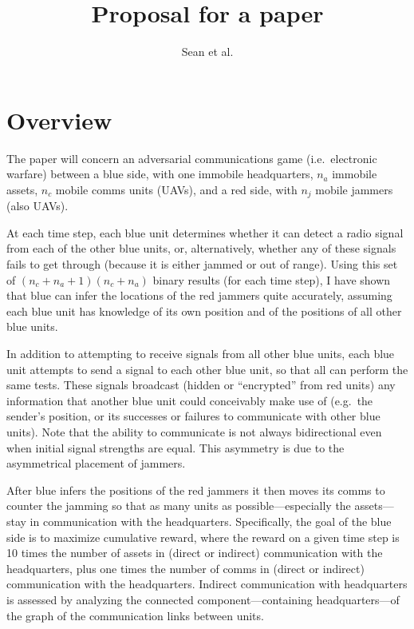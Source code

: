 \documentclass{article}
\title{Proposal for a paper}
\author{Sean et al.}
\begin{document}
\maketitle

\section{Overview}

The paper will concern an adversarial communications game
(i.e.\ electronic warfare) between a blue side, with one immobile
headquarters, $n_a$ immobile assets, $n_c$ mobile comms units (UAVs),
and a red side, with $n_j$ mobile jammers (also UAVs).

At each time step, each blue unit determines whether it can detect a
radio signal from each of the other blue units, or, alternatively,
whether any of these signals fails to get through (because it is
either jammed or out of range).  Using this set of $(n_c + n_a +
1)(n_c + n_a)$ binary results (for each time step), I have shown that
blue can infer the locations of the red jammers quite accurately,
assuming each blue unit has knowledge of its own position and of the
positions of all other blue units.

In addition to attempting to receive signals from all other blue
units, each blue unit attempts to send a signal to each other blue
unit, so that all can perform the same tests.  These signals broadcast
(hidden or ``encrypted'' from red units) any information that another
blue unit could conceivably make use of (e.g.\ the sender's position,
or its successes or failures to communicate with other blue units).
Note that the ability to communicate is not always bidirectional even
when initial signal strengths are equal.  This asymmetry is due to the
asymmetrical placement of jammers.

After blue infers the positions of the red jammers it then moves its
comms to counter the jamming so that as many units as
possible---especially the assets---stay in communication with the
headquarters.  Specifically, the goal of the blue side is to maximize
cumulative reward, where the reward on a given time step is 10 times
the number of assets in (direct or indirect) communication with the
headquarters, plus one times the number of comms in (direct or
indirect) communication with the headquarters.  Indirect communication
with headquarters is assessed by analyzing the connected
component---containing headquarters---of the graph of the
communication links between units.
\end{document}
